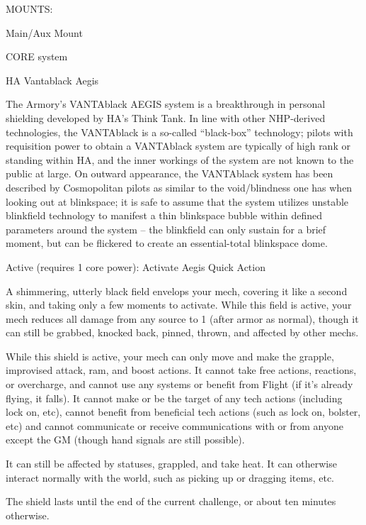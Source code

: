                                                  MOUNTS:

 Main/Aux Mount

                                               CORE system




                                                HA Vantablack Aegis

 The Armory’s VANTAblack AEGIS system is a breakthrough in personal shielding developed by HA’s
 Think Tank. In line with other NHP-derived technologies, the VANTAblack is a so-called “black-box”
 technology; pilots with requisition power to obtain a VANTAblack system are typically of high rank or
 standing within HA, and the inner workings of the system are not known to the public at large. On
 outward appearance, the VANTAblack system has been described by Cosmopolitan pilots as similar to
 the void/blindness one has when looking out at blinkspace; it is safe to assume that the system utilizes
 unstable blinkfield technology to manifest a thin blinkspace bubble within defined parameters around
 the system -- the blinkfield can only sustain for a brief moment, but can be flickered to create an
 essential-total blinkspace dome.

 Active (requires 1 core power): Activate Aegis
 Quick Action

 A shimmering, utterly black field envelops your mech, covering it like a second skin, and taking only a
 few moments to activate. While this field is active, your mech reduces all damage from any source to 1
 (after armor as normal), though it can still be grabbed, knocked back, pinned, thrown, and affected by
 other mechs.


 While this shield is active, your mech can only move and make the grapple, improvised attack, ram,
 and boost actions. It cannot take free actions, reactions, or overcharge, and cannot use any systems or
 benefit from Flight (if it’s already flying, it falls). It cannot make or be the target of any tech actions
 (including lock on, etc), cannot benefit from beneficial tech actions (such as lock on, bolster, etc) and
 cannot communicate or receive communications with or from anyone except the GM (though hand
 signals are still possible).


  It can still be affected by statuses, grappled, and take heat. It can otherwise interact normally with the
 world, such as picking up or dragging items, etc.


 The shield lasts until the end of the current challenge, or about ten minutes otherwise.

